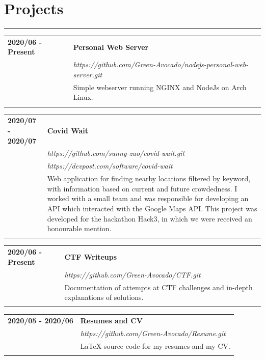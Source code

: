 \documentclass[letterpaper]{article}
\newcommand{\horizontalLine}{%
    \rule{\textwidth}{0.2pt}
    \vspace{1ex}
}
\begin{document}
    \section*{Projects}

        \horizontalLine

        \begin{tabular}{p{} p{}} 
            \textbf{2020/06 - Present} & \large\textbf{Personal Web Server} \\
            & \emph{https://github.com/Green-Avocado/nodejs-personal-web-server.git} \\
            & Simple webserver running NGINX and NodeJs on Arch Linux. \\
            \\
        \end{tabular}

        \begin{tabular}{p{} p{}} 
            \textbf{2020/07 - 2020/07} & \large\textbf{Covid Wait} \\
            & \emph{https://github.com/sunny-zuo/covid-wait.git} \\
            & \emph{https://devpost.com/software/covid-wait} \\
            & Web application for finding nearby locations filtered by keyword, with information based on current and future crowdedness.
            I worked with a small team and was responsible for developing an API which interacted with the Google Maps API.
            This project was developed for the hackathon Hack3, in which we were received an honourable mention. \\
            \\
        \end{tabular}

        \begin{tabular}{p{} p{}} 
            \textbf{2020/06 - Present} & \large\textbf{CTF Writeups} \\
            & \emph{https://github.com/Green-Avocado/CTF.git} \\
            & Documentation of attempts at CTF challenges and in-depth explanations of solutions. \\
            \\
        \end{tabular}

        \begin{tabular}{p{} p{}} 
            \textbf{2020/05 - 2020/06} & \large\textbf{Resumes and CV} \\
            & \emph{https://github.com/Green-Avocado/Resume.git} \\
            & LaTeX source code for my resumes and my CV. \\
            \\
        \end{tabular}
\end{document}
